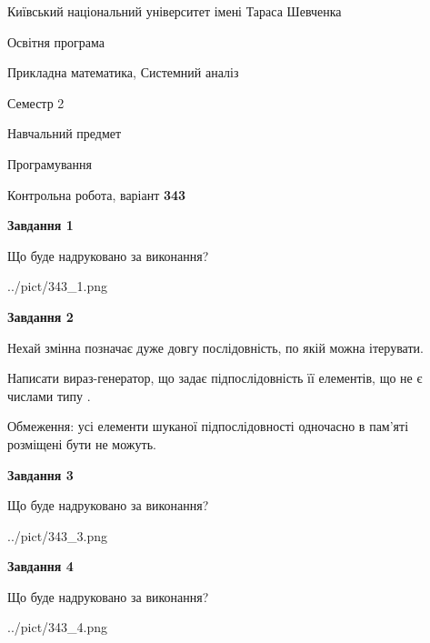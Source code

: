 \documentclass[12pt, ukrainian]{article}
\begin{document}
{{\begin {small}\par
{ \center  Київський національний університет імені Тараса Шевченка \par}
{\parbox {5 cm}{Освітня програма \hfill}{\parbox {8 cm}{Прикладна математика, Системний аналіз \hfill}}\parbox {5 cm}{\hfill Семестр 2}}\par
{\parbox {5 cm} {Навчальний предмет \hfill}\parbox {7 cm}{Програмування \hfill}\parbox {6cm}{\hfill}\par}\vspace{-7pt} \end{small}}{\center Контрольна робота, варіант  \No \textbf
{ 343 }\par}}
{
\begin {large}
{\begin {center}\textbf{Завдання 1}\end {center}}\par
Що буде надруковано за виконання?\par\par
\begin{center}
	{../pict/343_1.png}
\end{center}
\newpage

{\begin {center}\textbf{Завдання 2}\end {center}}\par
Нехай змінна  позначає дуже довгу послідовність, по якій можна ітерувати.

Написати вираз-генератор, що задає підпослідовність її елементів, що не є числами типу .

Обмеження: усі елементи шуканої підпослідовності одночасно в пам'яті розміщені бути не можуть.\par
\newpage

{\begin {center}\textbf{Завдання 3}\end {center}}\par
Що буде надруковано за виконання?\par
\begin{center}
	{../pict/343_3.png}
\end{center}
\newpage

{\begin {center}\textbf{Завдання 4}\end {center}}\par
Що буде надруковано за виконання?\par
\begin{center}
	{../pict/343_4.png}
\end{center}
\newpage


\end{large}}
\end{document}
